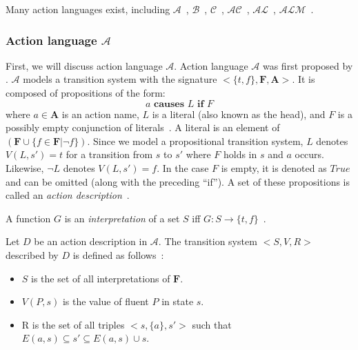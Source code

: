 Many action languages exist, including $ \mathcal{A} $~\citep{gelfond_action_1998}, $ \mathcal{B} $~\citep{gelfond_action_1998}, $ \mathcal{C} $~\citep{gelfond_action_1998}, $ \mathcal{AC} $~\citep{turner_representing_1997}, $ \mathcal{AL} $~\citep{baral_reasoning_2000}, $ \mathcal{ALM} $~\citep{inclezan_modular_2016}.

\subsubsection{Action language $ \mathcal{A} $}
\label{subsubsec:action_language_a}

First, we will discuss action language $ \mathcal{A} $.
Action language $ \mathcal{A} $ was first proposed by \citet{pednault_formulating_1987}.
$ \mathcal{A} $ models a transition system with the signature $ <\{t, f\}, \boldsymbol{F}, \boldsymbol{A}> $.
It is composed of propositions of the form:
\[
a \textbf{ causes } L \textbf{ if } F
\]
where $ a \in \boldsymbol{A} $ is an action name, $ L $ is a literal (also known as the head), and $ F $ is a possibly empty conjunction of literals~\citep{gelfond_action_1998}.
A literal is an element of $(\boldsymbol{F} \cup \{f \in \boldsymbol{F} | \neg f\})$.
Since we model a propositional transition system, $L$ denotes $V(L, s') = t$ for a transition from $s$ to $s'$ where $F$ holds in $s$ and $a$ occurs.
Likewise, $\neg L$ denotes $V(L, s')=f$.
In the case $ F $ is empty, it is denoted as $ True $ and can be omitted (along with the preceding ``if'').
A set of these propositions is called an \textit{action description}~\citep{gelfond_action_1998}.

\begin{definition}
    \label{def:interpretation}
    A function $G$ is an \textit{interpretation} of a set $S$ iff $G: S \rightarrow \{t, f\}$~\citep{gelfond_action_1998}.
\end{definition}

\begin{definition}
    Let $ D $ be an action description in $ \mathcal{A} $.
    The transition system $ <S, V, R> $ described by $ D $ is defined as follows~\citep{gelfond_action_1998}:

    \begin{itemize}
        \item $ S $ is the set of all interpretations of $ \boldsymbol{F} $.
        \item $ V(P, s) $ is the value of fluent $P$ in state $s$.
        \item R is the set of all triples $ <s, \{a\}, s'> $ such that $ E(a,s) \subseteq s' \subseteq E(a,s) \cup s $.
    \end{itemize}
\end{definition}


